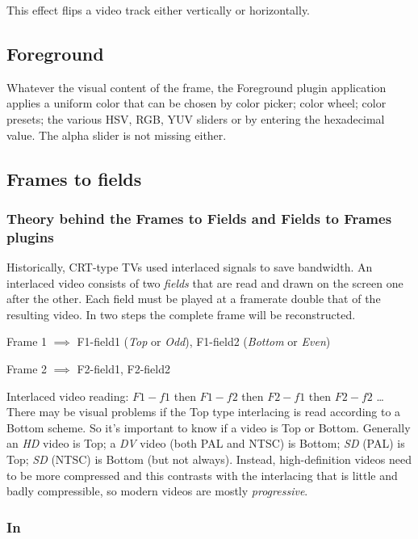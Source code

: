 This effect flips a video track either vertically or horizontally.

\subsection{Foreground}%
\label{sub:foreground}

Whatever the visual content of the frame, the Foreground plugin application applies a uniform color that can be chosen by color picker; color wheel; color presets; the various HSV, RGB, YUV sliders or by entering the hexadecimal value. The alpha slider is not missing either.

\subsection{Frames to fields}%
\label{sub:frames_to_fields}

\subsubsection*{Theory behind the Frames to Fields and Fields to Frames plugins}
\label{ssub:theory_frames_fields}

Historically, CRT-type TVs used interlaced signals to save bandwidth. An interlaced video consists of two \textit{fields} that are read and drawn on the screen one after the other. Each field must be played at a framerate double that of the resulting video. In two steps the complete frame will be reconstructed.

Frame 1 $\implies$ F1-field1 (\textit{Top} or \textit{Odd}), F1-field2 (\textit{Bottom} or \textit{Even})

Frame 2 $\implies$ F2-field1, F2-field2

Interlaced video reading: $F1-f1$ then $F1-f2$ then $F2-f1$ then $F2-f2$ \dots
There may be visual problems if the Top type interlacing is read according to a Bottom scheme. So it's important to know if a video is Top or Bottom. Generally an \textit{HD} video is Top; a \textit{DV} video (both PAL and NTSC) is Bottom; \textit{SD} (PAL) is Top; \textit{SD} (NTSC) is Bottom (but not always). Instead, high-definition videos need to be more compressed and this contrasts with the interlacing that is little and badly compressible, so modern videos are mostly \textit{progressive}.

\subsubsection*{In \CGG{}}
\label{ssub:in_cin_gg}


